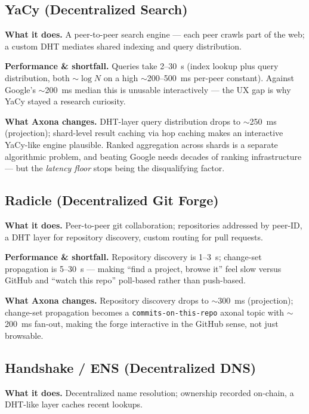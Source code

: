 \documentclass[nobib]{tufte-handout}
\begin{document}
\subsection{YaCy (Decentralized Search)}

\textbf{What it does.} A peer-to-peer search engine --- each peer crawls
part of the web; a custom DHT mediates shared indexing and query
distribution.

\textbf{Performance \& shortfall.} Queries take 2--30~s (index lookup
plus query distribution, both $\sim\!\log N$ on a high
$\sim$200--500~ms per-peer constant). Against Google's $\sim$200~ms
median this is unusable interactively --- the UX gap is why YaCy stayed
a research curiosity.

\textbf{What Axona changes.} DHT-layer query distribution drops to
$\sim$250~ms (projection); shard-level result caching via hop caching
makes an interactive YaCy-like engine plausible. Ranked aggregation
across shards is a separate algorithmic problem, and beating Google
needs decades of ranking infrastructure --- but the \emph{latency
floor} stops being the disqualifying factor.

\subsection{Radicle (Decentralized Git Forge)}

\textbf{What it does.} Peer-to-peer git collaboration; repositories
addressed by peer-ID, a DHT layer for repository discovery, custom
routing for pull requests.

\textbf{Performance \& shortfall.} Repository discovery is 1--3~s;
change-set propagation is 5--30~s --- making ``find a project, browse
it'' feel slow versus GitHub and ``watch this repo'' poll-based rather
than push-based.

\textbf{What Axona changes.} Repository discovery drops to
$\sim$300~ms (projection); change-set propagation becomes a
\texttt{commits-on-this-repo} axonal topic with $\sim$200~ms fan-out,
making the forge interactive in the GitHub sense, not just
browsable.

\subsection{Handshake / ENS (Decentralized DNS)}

\textbf{What it does.} Decentralized name resolution; ownership
recorded on-chain, a DHT-like layer caches recent lookups.
\end{document}
